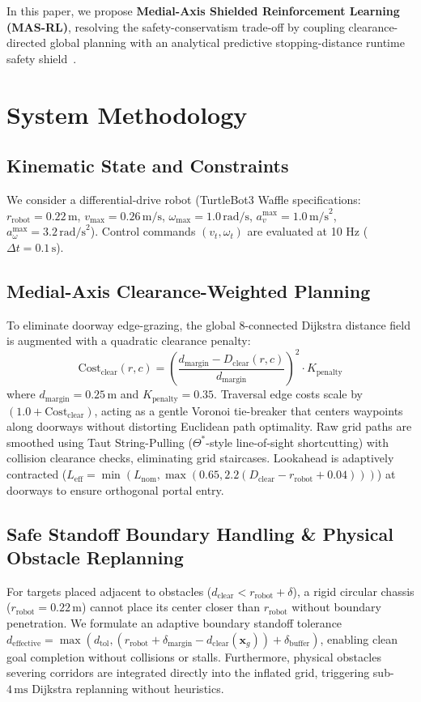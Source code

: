 \documentclass[conference]{IEEEtran}
\begin{document}
In this paper, we propose \textbf{Medial-Axis Shielded Reinforcement Learning (MAS-RL)}, resolving the safety-conservatism trade-off by coupling clearance-directed global planning with an analytical predictive stopping-distance runtime safety shield~\cite{ames2019cbf, chiang2021execution}.

\section{System Methodology}

\subsection{Kinematic State and Constraints}
We consider a differential-drive robot (TurtleBot3 Waffle specifications: $r_{\text{robot}} = 0.22\,\text{m}$, $v_{\max} = 0.26\,\text{m/s}$, $\omega_{\max} = 1.0\,\text{rad/s}$, $a_v^{\max} = 1.0\,\text{m/s}^2$, $a_\omega^{\max} = 3.2\,\text{rad/s}^2$). Control commands $(v_t, \omega_t)$ are evaluated at 10 Hz ($\Delta t = 0.1\,\text{s}$).

\subsection{Medial-Axis Clearance-Weighted Planning}
To eliminate doorway edge-grazing, the global 8-connected Dijkstra distance field is augmented with a quadratic clearance penalty:
\begin{equation}
\text{Cost}_{\text{clear}}(r, c) = \left(\frac{d_{\text{margin}} - D_{\text{clear}}(r, c)}{d_{\text{margin}}}\right)^2 \cdot K_{\text{penalty}}
\end{equation}
where $d_{\text{margin}} = 0.25\,\text{m}$ and $K_{\text{penalty}} = 0.35$. Traversal edge costs scale by $(1.0 + \text{Cost}_{\text{clear}})$, acting as a gentle Voronoi tie-breaker that centers waypoints along doorways without distorting Euclidean path optimality. Raw grid paths are smoothed using Taut String-Pulling ($\Theta^*$-style line-of-sight shortcutting) with collision clearance checks, eliminating grid staircases. Lookahead is adaptively contracted ($L_{\text{eff}} = \min(L_{\text{nom}}, \max(0.65, 2.2(D_{\text{clear}} - r_{\text{robot}} + 0.04)))$) at doorways to ensure orthogonal portal entry.

\subsection{Safe Standoff Boundary Handling \& Physical Obstacle Replanning}
For targets placed adjacent to obstacles ($d_{\text{clear}} < r_{\text{robot}} + \delta$), a rigid circular chassis ($r_{\text{robot}} = 0.22\,\text{m}$) cannot place its center closer than $r_{\text{robot}}$ without boundary penetration. We formulate an adaptive boundary standoff tolerance $d_{\text{effective}} = \max\left(d_{\text{tol}}, \left(r_{\text{robot}} + \delta_{\text{margin}} - d_{\text{clear}}(\mathbf{x}_g)\right) + \delta_{\text{buffer}}\right)$, enabling clean goal completion without collisions or stalls. Furthermore, physical obstacles severing corridors are integrated directly into the inflated grid, triggering sub-$4\,\text{ms}$ Dijkstra replanning without heuristics.
\end{document}
